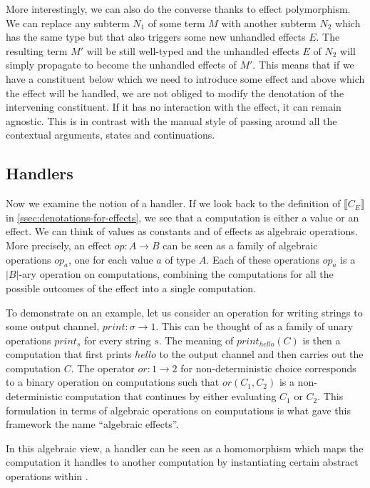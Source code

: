 \documentclass{article}
\newcommand{\sem}[1]{\llbracket #1 \rrbracket}
\begin{document}
More interestingly, we can also do the converse thanks to effect
polymorphism. We can replace any subterm $N_1$ of some term $M$ with another
subterm $N_2$ which has the same type but that also triggers some new
unhandled effects $E$. The resulting term $M'$ will be still well-typed and
the unhandled effects $E$ of $N_2$ will simply propagate to become the
unhandled effects of $M'$. This means that if we have a constituent below
which we need to introduce some effect and above which the effect will be
handled, we are not obliged to modify the denotation of the intervening
constituent. If it has no interaction with the effect, it can remain
agnostic. This is in contrast with the manual style of passing around all the
contextual arguments, states and continuations.

\subsection{Handlers}

Now we examine the notion of a handler. If we look back to the definition of
$\sem{C_E}$ in \ref{ssec:denotations-for-effects}, we see that a computation
is either a value or an effect. We can think of values as constants and of
effects as algebraic operations. More precisely, an effect $op : A \to B$ can
be seen as a family of algebraic operations $op_a$, one for each value $a$ of
type $A$. Each of these operations $op_a$ is a $\left| B \right|$-ary
operation on computations, combining the computations for all the possible
outcomes of the effect into a single computation.

To demonstrate on an example, let us consider an operation for writing strings
to some output channel, $print : \sigma \to 1$. This can be thought of as a
family of unary operations $print_s$ for every string $s$. The meaning of
$print_{hello}(C)$ is then a computation that first prints $hello$ to the
output channel and then carries out the computation $C$. The operator $or : 1
\to 2$ for non-deterministic choice corresponds to a binary operation on
computations such that $or(C_1, C_2)$ is a non-deterministic computation that
continues by either evaluating $C_1$ or $C_2$. This formulation in terms of
algebraic operations on computations is what gave this framework the name
``algebraic effects''.

In this algebraic view, a handler can be seen as a homomorphism which maps the
computation it handles to another computation by instantiating certain
abstract operations within \citep{plotkin2009handlers}
\citep{pretnar2010logic}.
\end{document}
